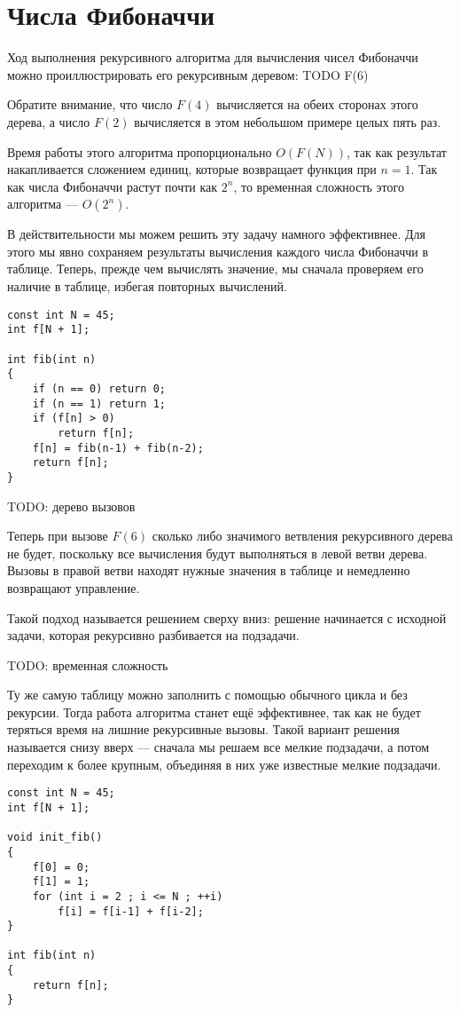 \section{Числа Фибоначчи}

Ход выполнения рекурсивного алгоритма для вычисления чисел Фибоначчи
можно проиллюстрировать его рекурсивным деревом: TODO F(6)

Обратите внимание, что число $F(4)$ вычисляется на обеих сторонах этого дерева, а число
$F(2)$ вычисляется в этом небольшом примере целых пять раз.

Время работы этого алгоритма пропорционально $O(F(N))$, так как результат накапливается
сложением единиц, которые возвращает функция при $n=1$. Так как числа Фибоначчи растут почти
как $2^n$, то временная сложность этого алгоритма --- $O(2^n)$.

В действительности мы можем решить эту задачу намного эффективнее. Для этого мы явно сохраняем
результаты вычисления каждого числа Фибоначчи в таблице. Теперь, прежде чем вычислять
значение, мы сначала проверяем его наличие в таблице, избегая повторных вычислений.

\begin{lstlisting}
const int N = 45;
int f[N + 1];

int fib(int n)
{
    if (n == 0) return 0;
    if (n == 1) return 1;
    if (f[n] > 0)
        return f[n];
    f[n] = fib(n-1) + fib(n-2);
    return f[n];
}
\end{lstlisting}

TODO: дерево вызовов

Теперь при вызове $F(6)$ сколько либо значимого ветвления рекурсивного дерева не будет,
поскольку все вычисления будут выполняться в левой ветви дерева. Вызовы в правой ветви
находят нужные значения в таблице и немедленно возвращают управление.

Такой подход называется решением сверху вниз: решение начинается с исходной задачи, которая 
рекурсивно разбивается на подзадачи.

TODO: временная сложность

Ту же самую таблицу можно заполнить с помощью обычного цикла и без рекурсии.
Тогда работа алгоритма станет ещё эффективнее, так как не будет теряться время на
лишние рекурсивные вызовы.
Такой вариант решения называется снизу вверх --- сначала мы решаем все мелкие подзадачи,
а потом переходим к более крупным, объединяя в них уже известные мелкие подзадачи.

\begin{lstlisting}
const int N = 45;
int f[N + 1];

void init_fib()
{
    f[0] = 0;
    f[1] = 1;
    for (int i = 2 ; i <= N ; ++i)
        f[i] = f[i-1] + f[i-2];
}

int fib(int n)
{
    return f[n];
}
\end{lstlisting}

